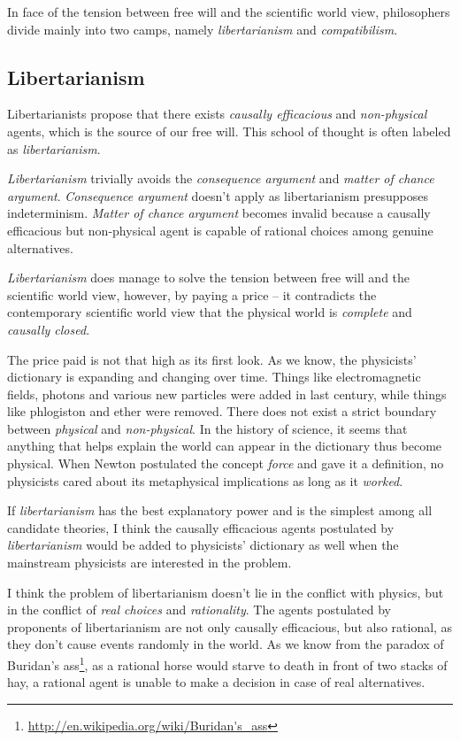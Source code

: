 In face of the tension between free will and the scientific world view, philosophers divide mainly into two camps, namely \emph{libertarianism} and \emph{compatibilism}.

\subsection{Libertarianism}

Libertarianists propose that there exists \emph{causally efficacious} and \emph{non-physical} agents, which is the source of our free will. This school of thought is often labeled as \emph{libertarianism}.

\emph{Libertarianism} trivially avoids the \emph{consequence argument} and \emph{matter of chance argument}. \emph{Consequence argument} doesn't apply as libertarianism presupposes indeterminism. \emph{Matter of chance argument} becomes invalid because a causally efficacious but non-physical agent is capable of rational choices among genuine alternatives.

\emph{Libertarianism} does manage to solve the tension between free will and the scientific world view, however, by paying a price -- it contradicts the contemporary scientific world view that the physical world is \emph{complete} and \emph{causally closed}.

The price paid is not that high as its first look. As we know, the physicists' dictionary is expanding and changing over time. Things like electromagnetic fields, photons and various new particles were added in last century, while things like phlogiston and ether were removed. There does not exist a strict boundary between \emph{physical} and \emph{non-physical}. In the history of science, it seems that anything that helps explain the world can appear in the dictionary thus become physical. When Newton postulated the concept \emph{force} and gave it a definition, no physicists cared about its metaphysical implications as long as it \emph{worked}.

If \emph{libertarianism} has the best explanatory power and is the simplest among all candidate theories, I think the causally efficacious agents postulated by \emph{libertarianism} would be added to physicists' dictionary as well when the mainstream physicists are interested in the problem.

\iffalse
I think the problem of libertarianism doesn't lie in the conflict with physics, but in the conflict of \emph{real choices} and \emph{rationality}. The agents postulated by proponents of libertarianism are not only causally efficacious, but also rational, as they don't cause events randomly in the world. As we know from the paradox of Buridan's ass\footnote{\url{http://en.wikipedia.org/wiki/Buridan's_ass}}, as a rational horse would starve to death in front of two stacks of hay, a rational agent is unable to make a decision in case of real alternatives.

